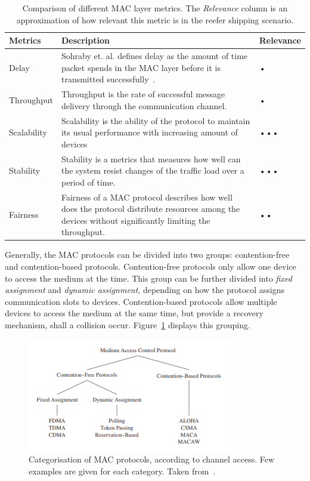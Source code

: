 \begin{table}[ht]
    \centering
    \begin{tabularx}{\textwidth}{|l|X|p{5em}|}
    \hline
    \textbf{Metrics}&\textbf{Description}&\textbf{Relevance}\\
    \hline
    Delay&Sohraby et. al. defines delay as the amount of time packet spends in the MAC layer before it is transmitted successfully~\cite{Sohraby2007WirelessApplications}.&•\\
    \hline
    Throughput&Throughput is the rate of successful message delivery through the communication channel.&•\\
    \hline
    Scalability&Scalability is the ability of the protocol to maintain its usual performance with increasing amount of devices&•••\\
    \hline
    Stability&Stability is a metrics that measures how well can the system resist changes of the traffic load over a period of time.&•••\\
    \hline
    Fairness&Fairness of a MAC protocol describes how well does the protocol distribute resources among the devices without significantly limiting the throughput.&••\\
    \hline
    \end{tabularx}
    \caption{Comparison of different MAC layer metrics. The \textit{Relevance} column is an approximation of how relevant this metric is in the reefer shipping scenario.}
    \label{tab:mac-metrics}
\end{table}

Generally, the MAC protocols can be divided into two groups: contention-free and contention-based protocols. Contention-free protocols only allow one device to access the medium at the time. This group can be further divided into \textit{fixed assignment} and \textit{dynamic assignment}, depending on how the protocol assigns communication slots to devices. Contention-based protocols allow multiple devices to access the medium at the same time, but provide a recovery mechanism, shall a collision occur. Figure~\ref{fig:mac-categories} displays this grouping.

\begin{figure}[ht]
    \centering
    \includegraphics[width=0.8\textwidth]{00images/mac-categories}
    \caption{Categorisation of MAC protocols, according to channel access. Few examples are given for each category. Taken from~\cite{2011MediumControl}.}
    \label{fig:mac-categories}
\end{figure}